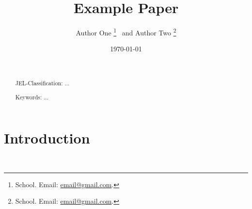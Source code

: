 \documentclass[12pt]{article}
\title{Example Paper}
\author{
    Author One%
    \thanks{School. Email: \href{mailto:email@gmail.com}{email@gmail.com}.} \ and Author Two%
    \thanks{School. Email: \href{mailto:email@gmail.com}{email@gmail.com}.}
}
\date{\today}
\begin{document}
\maketitle
\begin{abstract}


  \par~\par\noindent
  {\color{asher}JEL-Classification:} ...
  \par\noindent
  {\color{asher}Keywords:} ...
  \par\vspace{-2.5mm}
\end{abstract}

\newpage



\section{Introduction}







\newpage~\appendix
{}
\renewcommand{\thefigure}{\Alph{section}\arabic{figure}}
\renewcommand{\thetable}{\Alph{section}\arabic{table}}
\end{document}
